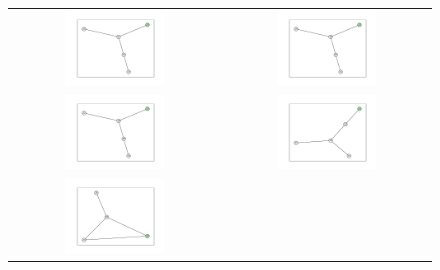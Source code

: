 \documentclass[12pt, a4paper]{extarticle}
\begin{document}
\begin{figure}\centering\begin{tabularx}{\textwidth}{cc}
\includegraphics[width=0.5\textwidth]{task11-graphlets/5_14-13-21-20-23.pdf} &
\includegraphics[width=0.5\textwidth]{task11-graphlets/5_14-16-18-19-23.pdf} \\
\includegraphics[width=0.5\textwidth]{task11-graphlets/5_10-16-18-22-23.pdf} &
\includegraphics[width=0.5\textwidth]{task11-graphlets/5_14-16-17-18-23.pdf} \\
\includegraphics[width=0.5\textwidth]{task11-graphlets/4_25-23-24-26.pdf} &

\end{tabularx}
\end{figure}
\end{document}
